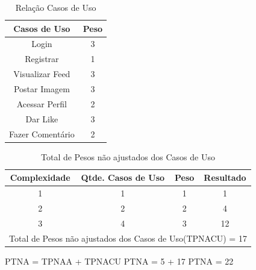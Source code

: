 \begin{table}[!htb]
	\caption[Atores]{Relação Casos de Uso}
	\label{tab:correlacao}
	\centering
	\begin{tabular}{c|c}
		Casos de Uso 		& Peso  \\ \hline
		Login       		& 3     \\
		Registrar    		& 1     \\
		Visualizar Feed	& 3     \\
		Postar Imagem		& 3     \\
		Acessar Perfil	& 2     \\
		Dar Like				& 3     \\
		Fazer Comentário	& 2     \\
	\end{tabular}
\end{table}


\begin{table}[!htb]
	\caption[TPNACU]{Total de Pesos não ajustados dos Casos de Uso}
	\label{tab:correlacao}
	\centering
	\begin{tabular}{c|c|c|c}
		Complexidade & Qtde. Casos de Uso & Peso & Resultado	\\ \hline
		1 			 &  		1		  &	1	 &	  1 		\\
		2 			 &  		2		  &	2	 &	  4 		\\
		3 			 &  		4		  &	3	 &	  12 		\\ \hline
		\multicolumn{4}{l}{Total de Pesos não ajustados dos Casos de Uso(TPNACU) = 17} \\
	\end{tabular}
\end{table}

PTNA = TPNAA + TPNACU
PTNA = 5 + 17
PTNA = 22

